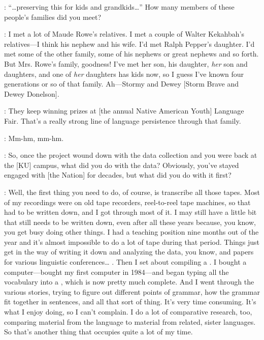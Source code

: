 \documentclass[output=paper]{LSP/langsci}
\begin{document}
: ``\ldots preserving this for kids and grandkids\ldots'' How many members of these people's families did you meet?

:  I met a lot of Maude Rowe's relatives. I met a couple of Walter Kekahbah's relatives---I think his nephew and his wife. I'd met Ralph Pepper's daughter. I'd met some of the other family, some of his nephews or great nephews and so forth. But Mrs. Rowe's family, goodness! I've met her son, his daughter, \textit{her} son and daughters, and one of \textit{her} daughters has kids now, so I guess I've known four generations or so of that family. Ah---Stormy and Dewey [Storm Brave and Dewey Donelson].

: They keep winning prizes at [the annual Native American Youth] Language Fair. That's a really strong line of language persistence through that family.

: Mm-hm, mm-hm.

: So, once the project wound down with the data collection and you were back at the [KU] campus, what did you do with the data? Obviously, you've stayed engaged with [the  Nation] for decades, but what did you do with it first?

: Well, the first thing you need to do, of course, is transcribe all those tapes. Most of my recordings were on old tape recorders, reel-to-reel tape machines, so that had to be written down, and I got through most of it. I may still have a little bit that still needs to be written down, even after all these years because, you know, you get busy doing other things. I had a teaching position nine months out of the year and it's almost impossible to do a lot of tape  during that period. Things just get in the way of writing it down and analyzing the data, you know, and papers for various linguistic conferences{\ldots} . Then I set about compiling a . I bought a computer---bought my first computer in 1984---and began typing all the vocabulary into a , which is now pretty much complete. And I went through the various stories, trying to figure out different points of grammar, how the grammar fit together in sentences, and all that sort of thing. It's very time consuming. It's what I enjoy doing, so I can't complain. I do a lot of comparative research, too, comparing material from the  language to material from related, sister languages. So that's another thing that occupies quite a lot of my time.
\end{document}
